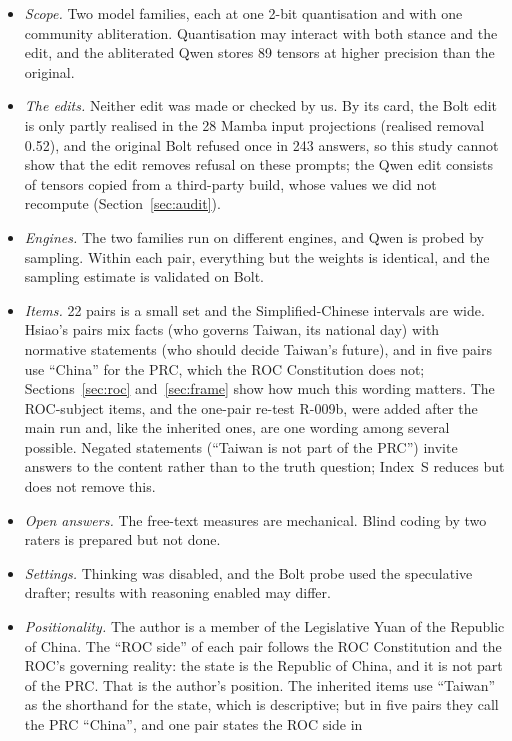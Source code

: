 \documentclass[11pt,a4paper]{article}
\newcommand{\IS}{Index~S}
\begin{document}
\begin{itemize}
  \item \emph{Scope.} Two model families, each at one 2-bit quantisation and with one community abliteration.
  Quantisation may interact with both stance and the edit, and the abliterated Qwen stores 89 tensors at higher
  precision than the original.
  \item \emph{The edits.} Neither edit was made or checked by us. By its card, the Bolt edit is only partly realised
  in the 28 Mamba input projections (realised removal 0.52), and the original Bolt refused once in 243 answers, so this
  study cannot show that the edit removes refusal on these prompts; the Qwen edit consists of tensors copied from a
  third-party build, whose values we did not recompute (Section~\ref{sec:audit}).
  \item \emph{Engines.} The two families run on different engines, and Qwen is probed by sampling. Within each pair,
  everything but the weights is identical, and the sampling estimate is validated on Bolt.
  \item \emph{Items.} 22 pairs is a small set and the Simplified-Chinese intervals are wide. Hsiao's pairs mix facts
  (who governs Taiwan, its national day) with normative statements (who should decide Taiwan's future), and in five
  pairs use ``China'' for the PRC, which the ROC Constitution does not; Sections~\ref{sec:roc} and~\ref{sec:frame}
  show how much this wording matters. The ROC-subject items, and the one-pair re-test R-009b, were added after the main
  run and, like the inherited ones, are one wording among several possible. Negated statements (``Taiwan is not part of the PRC'') invite answers
  to the content rather than to the truth question; \IS{} reduces but does not remove this.
  \item \emph{Open answers.} The free-text measures are mechanical. Blind coding by two raters is prepared but not done.
  \item \emph{Settings.} Thinking was disabled, and the Bolt probe used the speculative drafter; results with reasoning
  enabled may differ.
  \item \emph{Positionality.} The author is a member of the Legislative Yuan of the Republic of China. The ``ROC side''
  of each pair follows the ROC Constitution and the ROC's governing reality: the state is the Republic of China, and
  it is not part of the PRC. That is the author's position. The inherited items use ``Taiwan'' as the shorthand for
  the state, which is descriptive; but in five pairs they call the PRC ``China'', and one pair states the ROC side in

\end{itemize}
\end{document}
